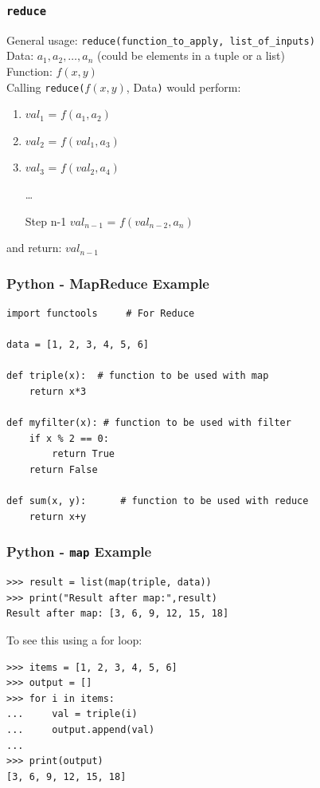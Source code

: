 \documentclass[xcolor=svgnames]{beamer}
\newcommand{\ft}[1]{\frametitle{#1}}
\begin{document}
\begin{frame}[fragile]\ft{\tt reduce}
General usage: \verb|reduce(function_to_apply, list_of_inputs)|\\[1em]

Data: $a_1, a_2, \dots, a_n$ (could be elements in a tuple or a list)\\
Function: $f(x,y)$\\[1em]

Calling {\tt reduce(}$f(x,y)$, Data{\tt )} would perform:
\begin{enumerate}[Step 1:]
\item $val_1$ = $f(a_1, a_2)$
\item $val_2$ = $f(val_1, a_3)$
\item $val_3$ = $f(val_2, a_4)$
\item[] \dots
\item[Step n-1] $val_{n-1}$ = $f(val_{n-2}, a_n)$
\end{enumerate}
and return:  $val_{n-1}$

\end{frame}





\begin{frame}[fragile]\ft{Python - MapReduce Example}
\begin{Verbatim}[xleftmargin=.1in] 
import functools     # For Reduce

data = [1, 2, 3, 4, 5, 6]

def triple(x):  # function to be used with map
    return x*3

def myfilter(x): # function to be used with filter
    if x % 2 == 0:
        return True
    return False

def sum(x, y):      # function to be used with reduce
    return x+y

\end{Verbatim}
\end{frame}


\begin{frame}[fragile]\ft{Python - {\tt map} Example}
\begin{Verbatim}[xleftmargin=.1in, frame=single] 
>>> result = list(map(triple, data))
>>> print("Result after map:",result)
Result after map: [3, 6, 9, 12, 15, 18]
\end{Verbatim}
To see this using a for loop:
\begin{Verbatim}[xleftmargin=.1in, frame=single] 
>>> items = [1, 2, 3, 4, 5, 6]
>>> output = []
>>> for i in items:
...     val = triple(i)
...     output.append(val)
... 
>>> print(output) 
[3, 6, 9, 12, 15, 18]
\end{Verbatim}
\end{frame}
\end{document}
